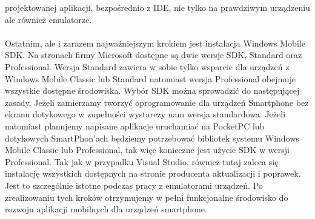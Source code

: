 projektowanej aplikacji, bezpośrednio z IDE, nie tylko na prawdziwym urządzeniu
ale również emulatorze. \\
\\
Ostatnim, ale i zarazem najważniejszym krokiem jest instalacja Windows Mobile
SDK. Na stronach firmy Microsoft dostępne są dwie wersje SDK, Standard oraz
Professional. Wersja Standard zawiera w sobie tylko wsparcie dla urządzeń z
Windows Mobile Classic lub Standard natomiast wersja Professional obejmuje
wszystkie dostępne środowiska. Wybór SDK można sprowadzić do następującej
zasady. Jeżeli zamierzamy tworzyć oprogramowanie dla urządzeń Smartphone bez
ekranu dotykowego w zupełności wystarczy nam wersja standardowa. Jeżeli
natomiast planujemy napisane aplikacje uruchamiać na PocketPC lub dotykowych
SmartPhon'ach będziemy potrzebować bibliotek systemu Windows Mobile Classic lub
Professional, tak więc konieczne jest użycie SDK w wersji Professional. Tak jak
w przypadku Visual Studio, również tutaj zaleca się instalację wszystkich
dostępnych na stronie producenta aktualizacji i poprawek. Jest to szczególnie
istotne podczas pracy z emulatorami urządzeń. Po zrealizowaniu tych kroków
otrzymujemy w pełni funkcjonalne środowisko do rozwoju aplikacji mobilnych dla
urządzeń smartphone.

